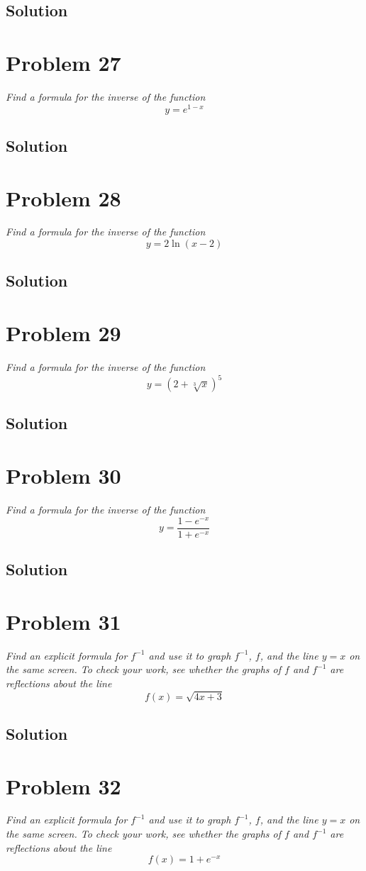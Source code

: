 \documentclass[11pt]{article}
\newcommand{\soln}{\subsection*}
\newcommand{\qn}{\textit}
\begin{document}
\soln{Solution}

\section*{Problem 27}

\qn{Find a formula for the inverse of the function $$y=e^{1-x}$$}

\soln{Solution}

\section*{Problem 28}

\qn{Find a formula for the inverse of the function $$y=2\ln(x-2)$$}

\soln{Solution}

\section*{Problem 29}

\qn{Find a formula for the inverse of the function $$y=(2+\sqrt[3]{x})^5$$}

\soln{Solution}

\section*{Problem 30}

\qn{Find a formula for the inverse of the function $$y=\frac{1-e^{-x}}{1+e^{-x}}$$}

\soln{Solution}

\section*{Problem 31}

\qn{Find an explicit formula for $f^{-1}$ and use it to graph $f^{-1}$, $f$, and the line $y=x$ on the same screen. To check your work, see whether the graphs of $f$ and $f^{-1}$ are reflections about the line $$f(x)=\sqrt{4x+3}$$}

\soln{Solution}

\section*{Problem 32}

\qn{Find an explicit formula for $f^{-1}$ and use it to graph $f^{-1}$, $f$, and the line $y=x$ on the same screen. To check your work, see whether the graphs of $f$ and $f^{-1}$ are reflections about the line $$f(x)=1+e^{-x}$$}
\end{document}
